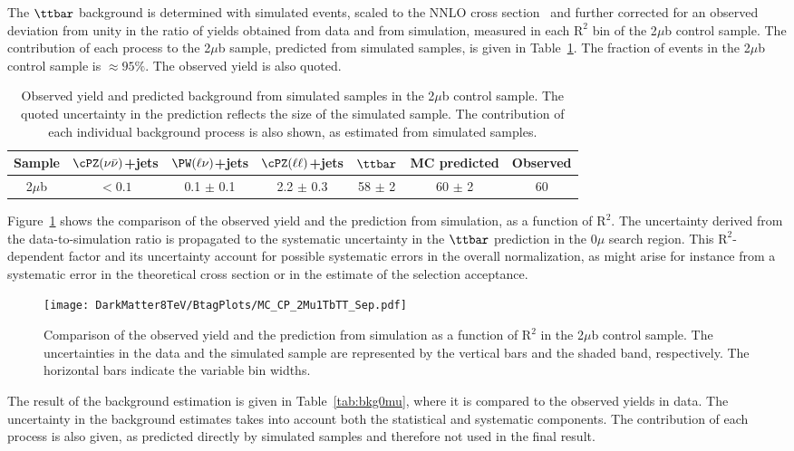 {{The $\ttbar$ background is determined with simulated
events, scaled to the NNLO cross section~\cite{WatNNLO,ZatNNLO,TTbaratNNLO} and further corrected for an
observed deviation from unity in the ratio 
of yields obtained from data and from simulation, measured in each $\mathrm{R^2}$ bin
of the 2$\mu$b control sample. The contribution of each  process to
the 2$\mu$b sample, predicted from simulated samples, is given in
Table~\ref{tab:2mub}. The fraction of \ttbar events in the 2$\mu$b
control sample is $\approx 95\%$. The observed yield is also
quoted. 
\begin{table}[h!]
  \caption{\label{tab:2mub} Observed yield and predicted
    background from simulated
    samples in the 2$\mu$b control sample. The quoted uncertainty in
    the prediction reflects the size of the simulated sample. The
    contribution of each individual background process is also shown,
    as estimated from simulated samples.}
\small
\centering
\begin{tabular}{|c|c|c|c|c|c|c|} 
  \hline
  Sample  &  $\cPZ(\nu \bar \nu)$+jets  &  $\PW(\ell \nu)$+jets  &
  $\cPZ(\ell \ell)$+jets  &  $\ttbar$  & MC predicted &  Observed \\
  \hline
  2$\mu$b  &   $<0.1$  & 0.1 $\pm$ 0.1 & 2.2 $\pm$ 0.3 & 58 $\pm$ 2 & 60 $\pm$ 2 & 60\\
  \hline
\end{tabular}
\end{table}
Figure~\ref{fig:2mub} shows the comparison of the observed
yield and the prediction from simulation, as a function of
$\mathrm{R^2}$. The uncertainty derived from the data-to-simulation ratio is
propagated to the systematic uncertainty in the $\ttbar$ prediction in
the 0$\mu$ search region. This $\mathrm{R^2}$-dependent factor and its
uncertainty account for possible systematic errors in the overall normalization, 
as might arise for instance from a systematic error in the theoretical cross section or in the estimate of the selection acceptance.

\begin{figure}[h!]
  \centering
   \texttt{[image: DarkMatter8TeV/BtagPlots/MC\_CP\_2Mu1TbTT\_Sep.pdf]}
   \caption{Comparison of the observed yield and the prediction from
     simulation as a function of $\mathrm{R^2}$ in the 2$\mu$b control
     sample. The uncertainties in the data and the simulated
     sample are represented by the vertical bars and the shaded band,
     respectively. The horizontal bars indicate 
the variable bin widths.\label{fig:2mub}}
\end{figure}
The result of the background estimation is given in
Table~\ref{tab:bkg0mu}, where it is compared to the observed yields in
data. The uncertainty in the background estimates takes into account
both the statistical and systematic components. The contribution of each process is also given,
as predicted directly by simulated samples and therefore not used in
the final result.

}}
